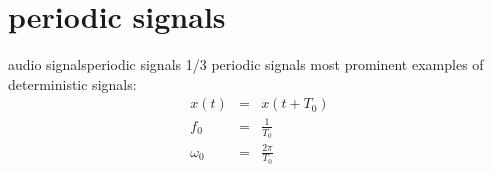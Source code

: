 \section{periodic signals}
\begin{frame}{audio signals}{periodic signals 1/3}
	\vspace{-3mm}
    periodic signals most prominent examples of deterministic signals: 
	\begin{eqnarray}
		x(t) 	&=& x(t+T_0)\nonumber\\
		f_0 	&=& \frac{1}{T_0}\nonumber\\
		\omega_0&=& \frac{2\pi}{T_0}\nonumber
	\end{eqnarray}
	
	\begin{figure}
		\centering
	\end{figure}
\end{frame}

